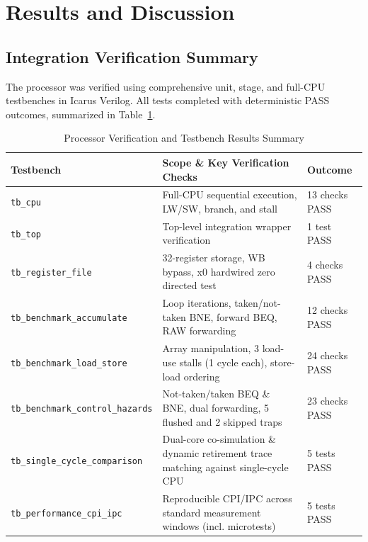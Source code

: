 \documentclass[conference]{IEEEtran}
\begin{document}
\section{Results and Discussion}

\subsection{Integration Verification Summary}
The processor was verified using comprehensive unit, stage, and full-CPU testbenches in Icarus Verilog. All tests completed with deterministic PASS outcomes, summarized in Table~\ref{tab:test_summary}.

\begin{table}[htbp]
\caption{Processor Verification and Testbench Results Summary}
\label{tab:test_summary}
\centering
\small
\begin{tabularx}{\textwidth}{@{}lXl@{}}
\toprule
\textbf{Testbench} & \textbf{Scope \& Key Verification Checks} & \textbf{Outcome} \\
\midrule
\texttt{tb\_cpu} & Full-CPU sequential execution, LW/SW, branch, and stall & 13 checks PASS \\
\texttt{tb\_top} & Top-level integration wrapper verification & 1 test PASS \\
\texttt{tb\_register\_file} & 32-register storage, WB bypass, x0 hardwired zero directed test & 4 checks PASS \\
\texttt{tb\_benchmark\_accumulate} & Loop iterations, taken/not-taken BNE, forward BEQ, RAW forwarding & 12 checks PASS \\
\texttt{tb\_benchmark\_load\_store} & Array manipulation, 3 load-use stalls (1 cycle each), store-load ordering & 24 checks PASS \\
\texttt{tb\_benchmark\_control\_hazards} & Not-taken/taken BEQ \& BNE, dual forwarding, 5 flushed and 2 skipped traps & 23 checks PASS \\
\texttt{tb\_single\_cycle\_comparison} & Dual-core co-simulation \& dynamic retirement trace matching against single-cycle CPU & 5 tests PASS \\
\texttt{tb\_performance\_cpi\_ipc} & Reproducible CPI/IPC across standard measurement windows (incl. microtests) & 5 tests PASS \\
\bottomrule
\end{tabularx}
\end{table}
\end{document}
